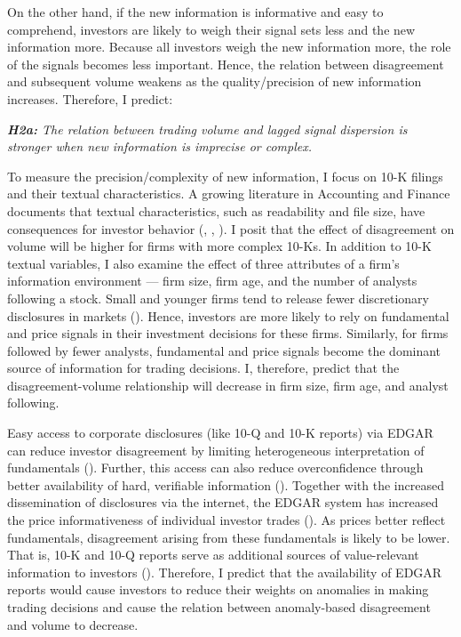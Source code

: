 \documentclass[
  12pt,
  a4paper,
  twoside,
  onecolumn]{article}
\begin{document}
On the other hand, if the new information is informative and easy to
comprehend, investors are likely to weigh their signal sets less and the
new information more. Because all investors weigh the new information
more, the role of the signals becomes less important. Hence, the
relation between disagreement and subsequent volume weakens as the
quality/precision of new information increases. Therefore, I predict:

\textit{\textbf{H2a:} The relation between trading volume and lagged signal dispersion is stronger when new information is imprecise or complex.}

To measure the precision/complexity of new information, I focus on 10-K
filings and their textual characteristics. A growing literature in
Accounting and Finance documents that textual characteristics, such as
readability and file size, have consequences for investor behavior
(\cite{li_readability_2008}, \cite{lm_2011_readability},
\cite{lawrence_2013_readability}). I posit that the effect of
disagreement on volume will be higher for firms with more complex 10-Ks.
In addition to 10-K textual variables, I also examine the effect of
three attributes of a firm's information environment --- firm size, firm
age, and the number of analysts following a stock. Small and younger
firms tend to release fewer discretionary disclosures in markets
(\cite{frankel_1995_discretionary}). Hence, investors are more likely to
rely on fundamental and price signals in their investment decisions for
these firms. Similarly, for firms followed by fewer analysts,
fundamental and price signals become the dominant source of information
for trading decisions. I, therefore, predict that the
disagreement-volume relationship will decrease in firm size, firm age,
and analyst following.

Easy access to corporate disclosures (like 10-Q and 10-K reports) via
EDGAR can reduce investor disagreement by limiting heterogeneous
interpretation of fundamentals (\cite{kandel_pearson1995}). Further,
this access can also reduce overconfidence through better availability
of hard, verifiable information
(\cite{scheinkman_xiong_overconfidence}). Together with the increased
dissemination of disclosures via the internet, the EDGAR system has
increased the price informativeness of individual investor trades
(\cite{gao_huang_2020}). As prices better reflect fundamentals,
disagreement arising from these fundamentals is likely to be lower. That
is, 10-K and 10-Q reports serve as additional sources of value-relevant
information to investors (\cite{griffin_2003}). Therefore, I predict
that the availability of EDGAR reports would cause investors to reduce
their weights on anomalies in making trading decisions and cause the
relation between anomaly-based disagreement and volume to decrease.
\end{document}
